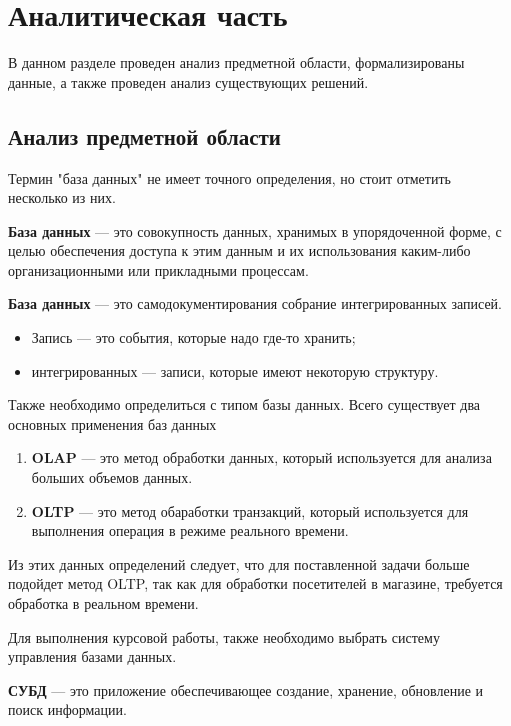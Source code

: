 \section{Аналитическая часть}

В данном разделе проведен анализ предметной области, формализированы данные,
а также проведен анализ существующих решений.

\subsection{Анализ предметной области}

Термин "база данных" не имеет точного определения, но стоит отметить несколько из них.


\textbf{База данных} \cite{bd-1} --- это совокупность данных, хранимых в упорядоченной форме, с целью
обеспечения доступа к этим данным и их использования каким-либо организационными
или прикладными процессам.

\textbf{База данных} --- это самодокументирования собрание интегрированных записей.

\begin{itemize}
    \item Запись --- это события, которые надо где-то хранить;
    \item интегрированных --- записи, которые имеют некоторую структуру.
\end{itemize}

Также необходимо определиться с типом базы данных. 
Всего существует два основных применения баз данных

\begin{enumerate}[label=\arabic*.]
    \item \textbf{OLAP} --- это метод обработки данных, который используется для анализа
                    больших объемов данных.
    \item \textbf{OLTP} --- это метод обаработки транзакций, который используется для
                    выполнения операция в режиме реального времени.
\end{enumerate}

Из этих данных определений следует, что для поставленной задачи больше подойдет метод
OLTP, так как для обработки посетителей в магазине, требуется обработка в реальном времени.

Для выполнения курсовой работы, также необходимо выбрать систему управления базами данных.

\textbf{СУБД} --- это приложение обеспечивающее создание, хранение, обновление и поиск информации.


